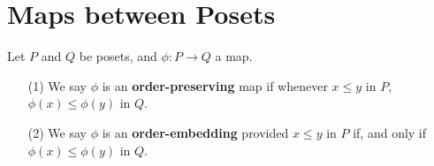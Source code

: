 \section{Maps between Posets}
\label{section_1.7}

\begin{definition}
  Let $P$ and  $Q$ be posets, and  $\phi:P \xrightarrow{} Q$ a map.
  \begin{enumerate}
    \item[(1)] We say $\phi$ is an \textbf{order-preserving} map if
      whenever $x \leq y$ in $P$,  $\phi(x) \leq \phi(y)$ in $Q$.

    \item[(2)] We say $\phi$ is an \textbf{order-embedding} provided
      $x \leq y$ in $P$ if, and only if $\phi(x) \leq \phi(y)$ in $Q$.
  \end{enumerate}
\end{definition}


